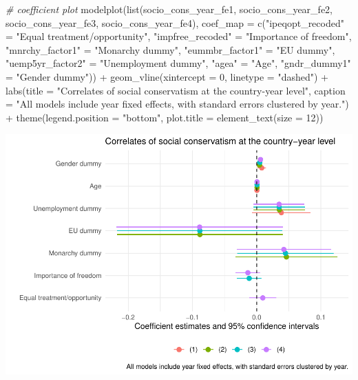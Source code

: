 \documentclass[
]{article}
\newenvironment{Shaded}{\begin{snugshade}}{\end{snugshade}}
\newcommand{\AttributeTok}[1]{\textcolor[rgb]{0.77,0.63,0.00}{#1}}
\newcommand{\CommentTok}[1]{\textcolor[rgb]{0.56,0.35,0.01}{\textit{#1}}}
\newcommand{\DecValTok}[1]{\textcolor[rgb]{0.00,0.00,0.81}{#1}}
\newcommand{\FunctionTok}[1]{\textcolor[rgb]{0.00,0.00,0.00}{#1}}
\newcommand{\NormalTok}[1]{#1}
\newcommand{\OtherTok}[1]{\textcolor[rgb]{0.56,0.35,0.01}{#1}}
\newcommand{\SpecialCharTok}[1]{\textcolor[rgb]{0.00,0.00,0.00}{#1}}
\newcommand{\StringTok}[1]{\textcolor[rgb]{0.31,0.60,0.02}{#1}}
\begin{document}
\begin{Shaded}
\begin{Highlighting}[]
\CommentTok{\# coefficient plot }
\FunctionTok{modelplot}\NormalTok{(}\FunctionTok{list}\NormalTok{(socio\_cons\_year\_fe1, socio\_cons\_year\_fe2, }
\NormalTok{                socio\_cons\_year\_fe3, socio\_cons\_year\_fe4),}
          \AttributeTok{coef\_map =} \FunctionTok{c}\NormalTok{(}\StringTok{"ipeqopt\_recoded"} \OtherTok{=} \StringTok{"Equal treatment/opportunity"}\NormalTok{, }
                       \StringTok{"impfree\_recoded"} \OtherTok{=} \StringTok{"Importance of freedom"}\NormalTok{, }
                       \StringTok{"mnrchy\_factor1"} \OtherTok{=} \StringTok{"Monarchy dummy"}\NormalTok{, }
                       \StringTok{"eummbr\_factor1"} \OtherTok{=} \StringTok{"EU dummy"}\NormalTok{, }
                       \StringTok{"uemp5yr\_factor2"} \OtherTok{=} \StringTok{"Unemployment dummy"}\NormalTok{, }
                       \StringTok{"agea"} \OtherTok{=} \StringTok{"Age"}\NormalTok{, }
                       \StringTok{"gndr\_dummy1"} \OtherTok{=} \StringTok{"Gender dummy"}\NormalTok{)) }\SpecialCharTok{+}
  \FunctionTok{geom\_vline}\NormalTok{(}\AttributeTok{xintercept =} \DecValTok{0}\NormalTok{, }\AttributeTok{linetype =} \StringTok{"dashed"}\NormalTok{) }\SpecialCharTok{+}
  \FunctionTok{labs}\NormalTok{(}\AttributeTok{title =} \StringTok{"Correlates of social conservatism at the country{-}year level"}\NormalTok{, }
       \AttributeTok{caption =} \StringTok{"All models include year fixed effects, with standard errors clustered by year."}\NormalTok{) }\SpecialCharTok{+}
  \FunctionTok{theme}\NormalTok{(}\AttributeTok{legend.position =} \StringTok{"bottom"}\NormalTok{, }
        \AttributeTok{plot.title =} \FunctionTok{element\_text}\NormalTok{(}\AttributeTok{size =} \DecValTok{12}\NormalTok{))}
\end{Highlighting}
\end{Shaded}

\includegraphics{AVCD-Assignment3-Edenhofer_files/figure-latex/socio-cons-year-fe-1.pdf}
\end{document}

